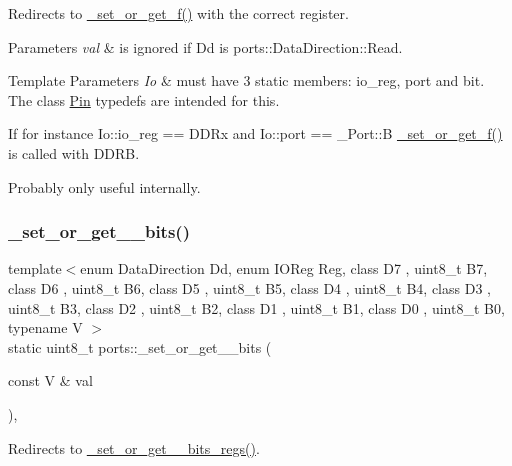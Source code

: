 Redirects to \hyperlink{namespaceports_a75686ee2e9a291c0095dec6d73e4af8d}{\+\_\+set\+\_\+or\+\_\+get\+\_\+f()} with the correct register. 


\begin{DoxyParams}{Parameters}
{\em val} & is ignored if Dd is ports\+::\+Data\+Direction\+::\+Read. \\
\hline
\end{DoxyParams}

\begin{DoxyTemplParams}{Template Parameters}
{\em Io} & must have 3 static members\+: {\ttfamily io\+\_\+reg}, {\ttfamily port} and {\ttfamily bit}. The class \hyperlink{structports_1_1Pin}{Pin} {\ttfamily typedef}s are intended for this.\\
\hline
\end{DoxyTemplParams}
If for instance Io\+::io\+\_\+reg == D\+D\+Rx and Io\+::port == \+\_\+\+Port\+::B \hyperlink{namespaceports_a75686ee2e9a291c0095dec6d73e4af8d}{\+\_\+set\+\_\+or\+\_\+get\+\_\+f()} is called with {\ttfamily D\+D\+RB}.

Probably only useful internally. \hypertarget{namespaceports_a9cb9b3646fb9795dfbe079336dfc6fbb}{}\label{namespaceports_a9cb9b3646fb9795dfbe079336dfc6fbb} 
\subsubsection{\texorpdfstring{\+\_\+set\+\_\+or\+\_\+get\+\_\+\_\+bits()}{\_set\_or\_get\_8\_bits()}}
{\footnotesize\ttfamily template$<$enum Data\+Direction Dd, enum I\+O\+Reg Reg, class D7 , uint8\+\_\+t B7, class D6 , uint8\+\_\+t B6, class D5 , uint8\+\_\+t B5, class D4 , uint8\+\_\+t B4, class D3 , uint8\+\_\+t B3, class D2 , uint8\+\_\+t B2, class D1 , uint8\+\_\+t B1, class D0 , uint8\+\_\+t B0, typename V $>$ \\
static uint8\+\_\+t ports\+::\+\_\+set\+\_\+or\+\_\+get\+\_\+\_\+bits (\begin{DoxyParamCaption}\item[{const V \&}]{val }\end{DoxyParamCaption})\hspace{0.3cm}{\ttfamily [inline]}, {\ttfamily [static]}}



Redirects to \hyperlink{namespaceports_a541ed8a2807f6d65c80cdf90cd7106eb}{\+\_\+set\+\_\+or\+\_\+get\+\_\+\_\+bits\+\_\+regs()}. 


